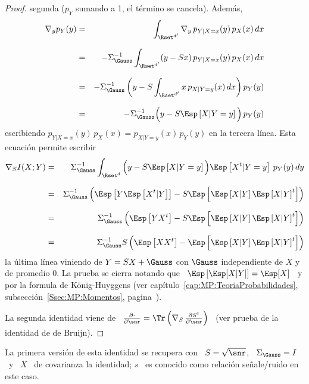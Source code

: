 \begin{proof}
  segunda ($p_Y$ sumando a 1, el t\'ermino se cancela). Adem\'as,
  \begin{eqnarray*}
  \nabla_y p_Y(y) & = & \int_{\Rset^{d'}} \nabla_y \, p_{Y|X=x}(y) \, p_X(x) \,
  dx\\[2.5mm]
  & = & - \Sigma_\Gauss^{-1} \int_{\Rset^{d'}} (y - S x) \, p_{Y|X=x}(y) \, p_X(x) \,
  dx\\[2.5mm]
  & = & - \Sigma_\Gauss^{-1} \left( y - S \int_{\Rset^{d'}} x \, p_{X|Y=y}(x) \,dx
  \right) p_Y(y)\\[2.5mm]
  & = & - \Sigma_\Gauss^{-1} \Big( y - S \Esp\left[X | Y=y \right] \Big) \, p_Y(y)
  \end{eqnarray*}
  escribiendo $p_{Y|X=x}(y)  \, p_X(x) =  p_{X|Y=y}(x) \, p_Y(y)$ en  la tercera
  l\'inea. Esta ecuaci\'on permite escribir
  \begin{eqnarray*}
  \nabla_S I(X;Y) & = & \Sigma_\Gauss^{-1} \int_{\Rset^d} \Big( y - S \Esp\left[X |
  Y=y \right] \Big) \Esp\left[X^t | Y=y \right] \, p_Y(y) \, dy\\[2.5mm]
  & = & \Sigma_\Gauss^{-1} \left( \Esp\left[ Y \Esp\left[ X^t|Y \right] \right] - S
  \Esp\left[ \Esp\left[X | Y \right] \Esp\left[X | Y \right]^t \right]
  \right)\\[2.5mm]
  & = & \Sigma_\Gauss^{-1} \left( \Esp\left[ Y X^t \right] - S \Esp\left[
  \Esp\left[X | Y \right] \Esp\left[X | Y \right]^t \right] \right)\\[2.5mm]
  & = & \Sigma_\Gauss^{-1} S \left( \Esp\left[ X X^t \right] - \Esp\left[
  \Esp\left[X | Y \right] \Esp\left[X | Y \right]^t \right] \right)
  \end{eqnarray*}
  la \'ultima l\'inea viniendo de $Y  = S X + \Gauss$ con $\Gauss$ independiente
  de  $X$ y  de  promedio 0.   La prueba  se  cierra notando  que \  $\Esp\left[
    \Esp[X|Y] \right]  = \Esp[X]$  \ y por  la formula de  K\"onig-Huyggens (ver
  cap\'itulo~\ref{cap:MP:TeoriaProbabilidades},
  subsecci\'on~\ref{Ssec:MP:Momentos}, pagina~\pageref{Ssec:MP:Momentos}).

  La  segunda identidad  viene de  \ $\frac{\partial  \cdot}{\partial  \snr} =
  \Tr\left(  \nabla_S \,  \frac{\partial S^t}{\partial  \snr} \right)$  \ (ver
  prueba de la identidad de de Bruijn).
\end{proof}
%
\noindent  La  primera versi\'on  de  esta  identidad se  recupera  con  \ $S  =
\sqrt{\snr}$, \ $\Sigma_\Gauss =  I$ \ y \ $X$ \ de  covarianza la identidad; $s$ \
es conocido como relaci\'on se\~nale/ruido en este caso.

